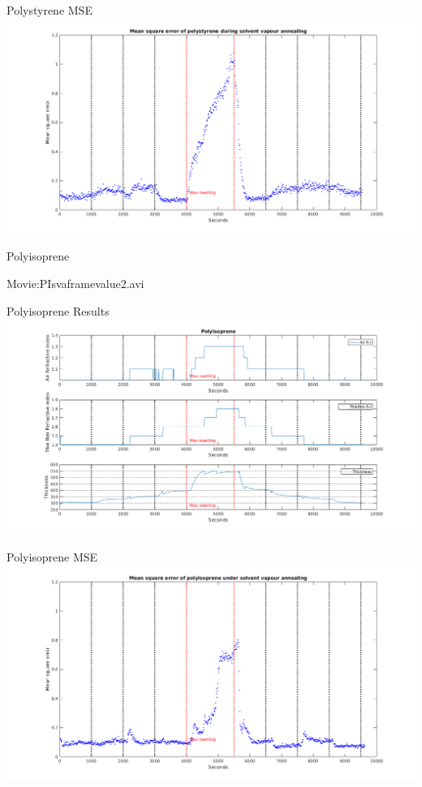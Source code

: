 \documentclass[10pt]{beamer}
\begin{document}
\begin{frame}{Polystyrene MSE}
\includegraphics[width=\textwidth]{PSswelling2.png}
\end{frame}


\begin{frame}{Polyisoprene}
\begin{center}
\Huge Movie:PIsvaframevalue2.avi
\end{center}
\end{frame}

\begin{frame}{Polyisoprene Results}
\includegraphics[width=\textwidth]{PIswelling1.png}
\end{frame}

\begin{frame}{Polyisoprene MSE}
\includegraphics[width=\textwidth]{PIswelling2.png}
\end{frame}
\end{document}
